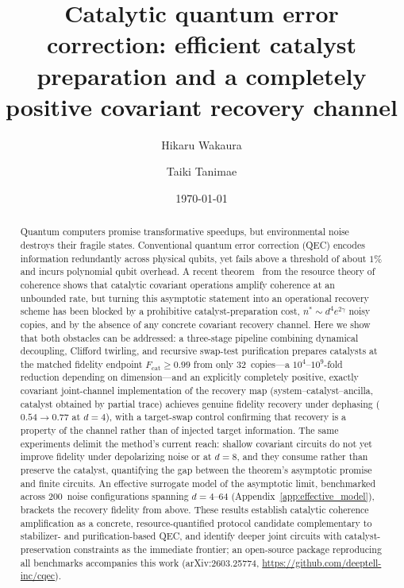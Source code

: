 \documentclass[pra,twocolumn,superscriptaddress,longbibliography,floatfix]{revtex4-2}
\begin{document}
\title{Catalytic quantum error correction: efficient catalyst preparation and a completely positive covariant recovery channel}

\author{Hikaru Wakaura}

\author{Taiki Tanimae}

\date{\today}

\begin{abstract}
Quantum computers promise transformative speedups, but environmental noise destroys their fragile states.
Conventional quantum error correction (QEC) encodes information redundantly across physical qubits, yet fails above a threshold of about $1\%$ and incurs polynomial qubit overhead.
A recent theorem~\cite{Shiraishi2024} from the resource theory of coherence shows that catalytic covariant operations amplify coherence at an unbounded rate, but turning this asymptotic statement into an operational recovery scheme has been blocked by a prohibitive catalyst-preparation cost, $n^{*} \sim d^{4} e^{2\gamma}$ noisy copies, and by the absence of any concrete covariant recovery channel.
Here we show that both obstacles can be addressed: a three-stage pipeline combining dynamical decoupling, Clifford twirling, and recursive swap-test purification prepares catalysts at the matched fidelity endpoint $F_\mathrm{cat} \geq 0.99$ from only 32~copies---a $10^{4}$--$10^{9}$-fold reduction depending on dimension---and an explicitly completely positive, exactly covariant joint-channel implementation of the recovery map (system--catalyst--ancilla, catalyst obtained by partial trace) achieves genuine fidelity recovery under dephasing ($0.54 \to 0.77$ at $d = 4$), with a target-swap control confirming that recovery is a property of the channel rather than of injected target information.
The same experiments delimit the method's current reach: shallow covariant circuits do not yet improve fidelity under depolarizing noise or at $d = 8$, and they consume rather than preserve the catalyst, quantifying the gap between the theorem's asymptotic promise and finite circuits.
An effective surrogate model of the asymptotic limit, benchmarked across 200~noise configurations spanning $d = 4$--$64$ (Appendix~\ref{app:effective_model}), brackets the recovery fidelity from above.
These results establish catalytic coherence amplification as a concrete, resource-quantified protocol candidate complementary to stabilizer- and purification-based QEC, and identify deeper joint circuits with catalyst-preservation constraints as the immediate frontier; an open-source package reproducing all benchmarks accompanies this work (arXiv:2603.25774, \url{https://github.com/deeptell-inc/cqec}).
\end{abstract}
\end{document}
